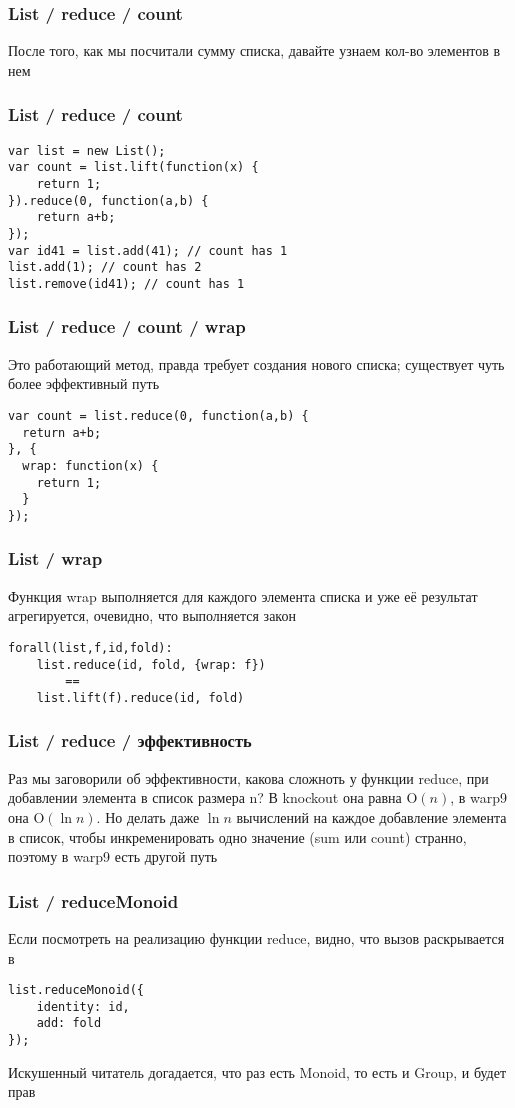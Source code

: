 \documentclass[xetex]{beamer}
\begin{document}
\begin{frame}[fragile]
\frametitle{List / reduce / count}
После того, как мы посчитали сумму списка, давайте узнаем кол-во элементов в нем
\end{frame}


\begin{frame}[fragile]
\frametitle{List / reduce / count}
\begin{lstlisting}
var list = new List();
var count = list.lift(function(x) { 
    return 1; 
}).reduce(0, function(a,b) { 
    return a+b; 
});
var id41 = list.add(41); // count has 1
list.add(1); // count has 2
list.remove(id41); // count has 1
\end{lstlisting}
\end{frame}


\begin{frame}[fragile]
\frametitle{List / reduce / count / wrap}
Это работающий метод, правда требует создания нового списка; существует чуть более эффективный путь
\vspace{10mm}
\begin{lstlisting}
var count = list.reduce(0, function(a,b) { 
  return a+b; 
}, {
  wrap: function(x) { 
    return 1; 
  } 
});
\end{lstlisting}
\end{frame}


\begin{frame}[fragile]
\frametitle{List / wrap}
Функция wrap выполняется для каждого элемента списка и уже её результат агрегируется, очевидно, что выполняется закон

\vspace{10mm}
\begin{lstlisting}
forall(list,f,id,fold): 
    list.reduce(id, fold, {wrap: f}) 
        == 
    list.lift(f).reduce(id, fold)
\end{lstlisting}
\end{frame}


\begin{frame}[fragile]
\frametitle{List / reduce / эффективность}
Раз мы заговорили об эффективности, какова сложноть у функции reduce, при добавлении элемента в список размера n? В knockout она равна $\mathrm{O}(n)$, в warp9 она $\mathrm{O}(\ln n)$. Но делать даже $\ln n$ вычислений на каждое добавление элемента в список, чтобы инкременировать одно значение (sum или count) странно, поэтому в warp9 есть другой путь
\end{frame}


\begin{frame}[fragile]
\frametitle{List / reduceMonoid}
Если посмотреть на реализацию функции reduce, видно, что вызов \quad раскрывается в 
\vspace{4mm}
\begin{lstlisting}
list.reduceMonoid({
    identity: id,
    add: fold
});
\end{lstlisting}
\vspace{4mm}
Искушенный читатель догадается, что раз есть Monoid, то есть и Group, и будет прав
\end{frame}
\end{document}
